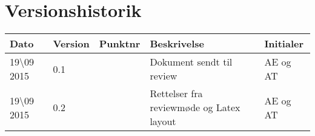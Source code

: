 \section{Versionshistorik}

\begin{center}
		\begin{longtable}{ | m{2.5cm} | m{2.5cm}| m{2.5cm}| m{2.5cm}| m{2.5cm}| } 
			\hline
			\textbf{Dato} & \textbf{Version} & \textbf{Punktnr} & \textbf{Beskrivelse} & \textbf{Initialer}  \\ 
			\hline
			19\textbackslash 09 2015 &  0.1 & & Dokument sendt til review & AE og AT \\
			\hline
		19\textbackslash 09 2015 &  0.2 & & Rettelser fra reviewmøde og Latex layout & AE og AT \\
			\hline
		\end{longtable}
		
	\end{center}
	\pagebreak